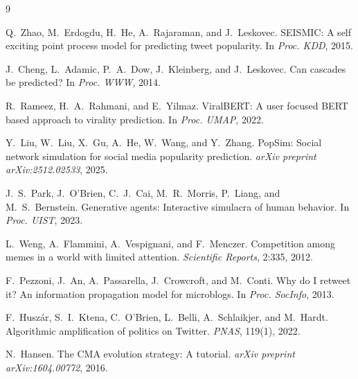 \documentclass[11pt]{article}
\begin{document}
\begin{thebibliography}{9}

Q.~Zhao, M.~Erdogdu, H.~He, A.~Rajaraman, and J.~Leskovec.
\newblock SEISMIC: A self exciting point process model for predicting tweet
popularity.
\newblock In \emph{Proc. KDD}, 2015.

J.~Cheng, L.~Adamic, P.~A.~Dow, J.~Kleinberg, and J.~Leskovec.
\newblock Can cascades be predicted?
\newblock In \emph{Proc. WWW}, 2014.

R.~Rameez, H.~A.~Rahmani, and E.~Yilmaz.
\newblock ViralBERT: A user focused BERT based approach to virality prediction.
\newblock In \emph{Proc. UMAP}, 2022.

Y.~Liu, W.~Liu, X.~Gu, A.~He, W.~Wang, and Y.~Zhang.
\newblock PopSim: Social network simulation for social media popularity
prediction.
\newblock \emph{arXiv preprint arXiv:2512.02533}, 2025.

J.~S.~Park, J.~O'Brien, C.~J.~Cai, M.~R.~Morris, P.~Liang, and M.~S.~Bernstein.
\newblock Generative agents: Interactive simulacra of human behavior.
\newblock In \emph{Proc. UIST}, 2023.

L.~Weng, A.~Flammini, A.~Vespignani, and F.~Menczer.
\newblock Competition among memes in a world with limited attention.
\newblock \emph{Scientific Reports}, 2:335, 2012.

F.~Pezzoni, J.~An, A.~Passarella, J.~Crowcroft, and M.~Conti.
\newblock Why do I retweet it? An information propagation model for microblogs.
\newblock In \emph{Proc. SocInfo}, 2013.

F.~Husz\'ar, S.~I.~Ktena, C.~O'Brien, L.~Belli, A.~Schlaikjer, and M.~Hardt.
\newblock Algorithmic amplification of politics on Twitter.
\newblock \emph{PNAS}, 119(1), 2022.

N.~Hansen.
\newblock The CMA evolution strategy: A tutorial.
\newblock \emph{arXiv preprint arXiv:1604.00772}, 2016.

\end{thebibliography}
\end{document}
